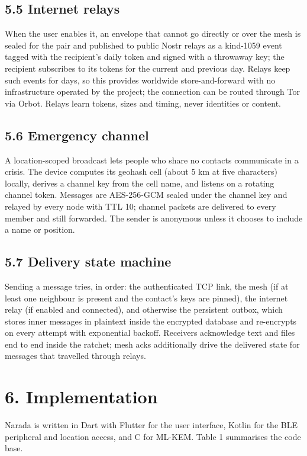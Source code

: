 \documentclass[conference]{IEEEtran}
\begin{document}
\subsection{5.5 Internet relays}
When the user enables it, an envelope that cannot go directly or over the mesh is sealed for the pair and published to public Nostr relays \cite{ref25} as a kind-1059 event \cite{ref26} tagged with the recipient's daily token and signed with a throwaway key; the recipient subscribes to its tokens for the current and previous day. Relays keep such events for days, so this provides worldwide store-and-forward with no infrastructure operated by the project; the connection can be routed through Tor via Orbot. Relays learn tokens, sizes and timing, never identities or content.

\subsection{5.6 Emergency channel}
A location-scoped broadcast lets people who share no contacts communicate in a crisis. The device computes its geohash cell (about 5 km at five characters) locally, derives a channel key from the cell name, and listens on a rotating channel token. Messages are AES-256-GCM sealed under the channel key and relayed by every node with TTL 10; channel packets are delivered to every member and still forwarded. The sender is anonymous unless it chooses to include a name or position.

\subsection{5.7 Delivery state machine}
Sending a message tries, in order: the authenticated TCP link, the mesh (if at least one neighbour is present and the contact's keys are pinned), the internet relay (if enabled and connected), and otherwise the persistent outbox, which stores inner messages in plaintext inside the encrypted database and re-encrypts on every attempt with exponential backoff. Receivers acknowledge text and files end to end inside the ratchet; mesh acks additionally drive the delivered state for messages that travelled through relays.

\section{6. Implementation}
Narada is written in Dart with Flutter for the user interface, Kotlin for the BLE peripheral and location access, and C for ML-KEM. Table 1 summarises the code base.
\end{document}
